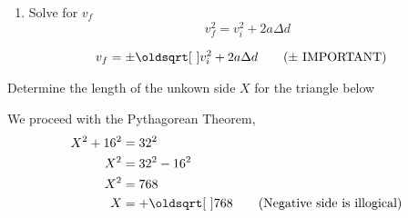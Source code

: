 \documentclass[11pt]{article} %
\begin{document}
\begin{qstn}[2]
\begin{enumerate}
\begin{soln}
\end{soln}


\item Solve for $v_f$ $$v_f^2 = v_i^2 + 2a\Delta d$$

\begin{soln}
\begin{align*}
v_f &= \pm \sqrt{v_i^2 + 2a\Delta d} \tag{\text{$\pm$ IMPORTANT}}
\end{align*}

\end{soln}



\end{enumerate}
\end{qstn}


\begin{qstn}[2]
Determine the length of the unkown side $X$ for the triangle below

\begin{center}
\end{center}


\begin{soln}
We proceed with the Pythagorean Theorem,
\begin{align*}
X^2 + 16^2 &= 32^2\\
X^2 &= 32^2 - 16^2\\
X^2 &= 768 \\ 
X &= +\sqrt{768} \tag{\text{Negative side is illogical}}
\end{align*}



\end{soln}



\end{qstn}
\end{document}
